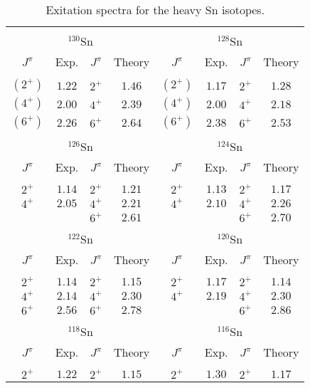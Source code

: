 \begin{table}[t]
\caption{Exitation spectra for the heavy Sn isotopes. \label{tab:2}}
\vspace{0.2cm}
\begin{center}
\footnotesize
\begin{tabular}{|cccc|cccc|}
\hline
&&&&&&&\\[-5pt]
\multicolumn{4}{|c|}{$^{130}$Sn}&\multicolumn{4}{|c|}{$^{128}$Sn}\\
$J^{\pi}$&Exp.&$J^{\pi}$&Theory&$J^{\pi}$&Exp.&$J^{\pi}$&Theory\\
\hline
&&&&&&&\\[-3pt]
$(2^{+})$ & $1.22$ & $2^{+}$   & $1.46$ &$(2^{+})$ & $1.17$ & $2^{+}$ & $1.28$\\
$(4^{+})$ & $2.00$ & $4^{+}$   & $2.39$ &$(4^{+})$ & $2.00$ & $4^{+}$ & $2.18$\\
$(6^{+})$ & $2.26$ & $6^{+}$   & $2.64$ &$(6^{+})$ & $2.38$ & $6^{+}$ & $2.53$\\[3pt]
\hline \hline
&&&&&&&\\[-5pt]
\multicolumn{4}{|c|}{$^{126}$Sn}&\multicolumn{4}{|c|}{$^{124}$Sn}\\
$J^{\pi}$&Exp.&$J^{\pi}$&Theory&$J^{\pi}$&Exp.&$J^{\pi}$&Theory\\
\hline
&&&&&&&\\[-3pt]
$2^{+}$ & $1.14$ & $2^{+}$   & $1.21$ &$2^{+}$ & $1.13$ & $2^{+}$ & $1.17$\\
$4^{+}$ & $2.05$ & $4^{+}$   & $2.21$ &$4^{+}$ & $2.10$ & $4^{+}$ & $2.26$\\
$     $ &        & $6^{+}$   & $2.61$ &        &        & $6^{+}$ & $2.70$\\[3pt]
\hline \hline
&&&&&&&\\[-5pt]
\multicolumn{4}{|c|}{$^{122}$Sn}&\multicolumn{4}{|c|}{$^{120}$Sn}\\
$J^{\pi}$&Exp.&$J^{\pi}$&Theory&$J^{\pi}$&Exp.&$J^{\pi}$&Theory\\
\hline
&&&&&&&\\[-3pt]
$2^{+}$   & $1.14$ & $2^{+}$   & $1.15$ & $2^{+}$  & $1.17$ & $2^{+}$ & $1.14$\\
$4^{+}$   & $2.14$ & $4^{+}$   & $2.30$ & $4^{+}$  & $2.19$ & $4^{+}$ & $2.30$\\
$6^{+}$   & $2.56$ & $6^{+}$   & $2.78$ &          &        & $6^{+}$ & $2.86$\\[3pt]
\hline \hline
&&&&&&&\\[-5pt]
\multicolumn{4}{|c|}{$^{118}$Sn}&\multicolumn{4}{|c|}{$^{116}$Sn}\\
$J^{\pi}$&Exp.&$J^{\pi}$&Theory&$J^{\pi}$&Exp.&$J^{\pi}$&Theory\\
\hline
&&&&&&&\\[-3pt]
$2^{+}$   & $1.22$ & $2^{+}$   & $1.15$ & $2^{+}$  & $1.30$ & $2^{+}$ & $1.17$\\[3pt]\hline
\end{tabular}
\end{center}
\end{table}

